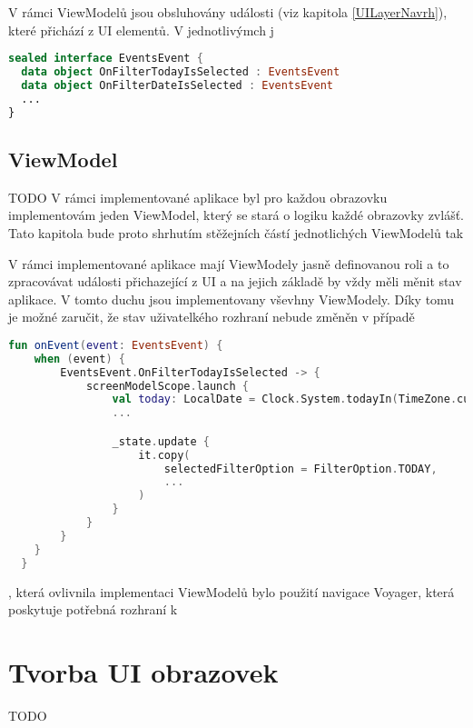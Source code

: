 V rámci ViewModelů jsou obsluhovány události (viz kapitola \ref{UILayerNavrh}), které přichází z UI elementů. V jednotlivýmch j



\begin{lstlisting}[caption={Použití stavu v aplikaci}, label={lst:StateImpl}, language=Kotlin]
sealed interface EventsEvent {
  data object OnFilterTodayIsSelected : EventsEvent
  data object OnFilterDateIsSelected : EventsEvent
  ...
}
\end{lstlisting}


\subsection{ViewModel} \label{ViewModelImpl}
TODO %
V rámci implementované aplikace byl pro každou obrazovku implementovám jeden ViewModel, který se stará o logiku každé obrazovky zvlášť. Tato kapitola 
bude proto shrhutím stěžejních částí jednotlichých ViewModelů tak 


V rámci implementované aplikace mají ViewModely jasně definovanou roli a to zpracovávat události přichazející z UI a na jejich základě by vždy měli
měnit stav aplikace. V tomto duchu jsou implementovany vševhny ViewModely. Díky tomu je možné zaručit, že stav uživatelkého rozhraní  nebude změněn
v případě 



\begin{lstlisting}[caption={Použití stavu v aplikaci}, label={lst:StateImpl}, language=Kotlin]
  fun onEvent(event: EventsEvent) {
    when (event) {
        EventsEvent.OnFilterTodayIsSelected -> {
            screenModelScope.launch {
                val today: LocalDate = Clock.System.todayIn(TimeZone.currentSystemDefault())
                ...

                _state.update {
                    it.copy(
                        selectedFilterOption = FilterOption.TODAY,
                        ...
                    )
                }
            }
        }
    }
  }
\end{lstlisting}

, která ovlivnila implementaci ViewModelů bylo použití navigace Voyager, která poskytuje potřebná rozhraní k 



\section{Tvorba UI obrazovek}
TODO %

